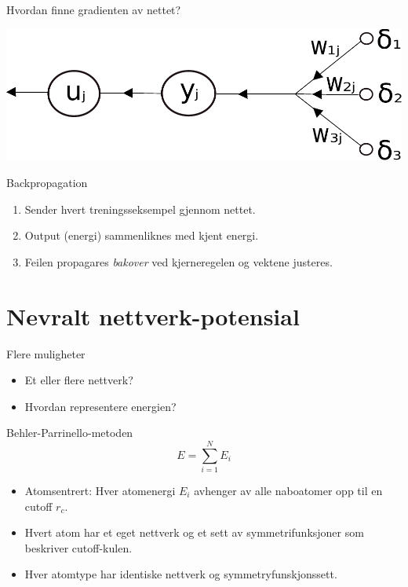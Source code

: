 \documentclass{beamer}
\begin{document}
\begin{frame}{Hvordan finne gradienten av nettet?}
 
\centering
\includegraphics[width = 0.8\linewidth]{../Figures/Theory/backprop.pdf}

\begin{block}{Backpropagation}
 \begin{enumerate}
  \item Sender hvert treningsseksempel gjennom nettet. 
  \item Output (energi) sammenliknes med kjent energi. 
  \item Feilen propagares \textit{bakover} ved kjerneregelen og vektene justeres. 
 \end{enumerate}
\end{block}
 
\end{frame}

\section{Nevralt nettverk-potensial}

\begin{frame}
 
\begin{block}{Flere muligheter}
 \begin{itemize}
  \item Et eller flere nettverk? 
  \item Hvordan representere energien?
 \end{itemize}
\end{block}

\begin{block}{Behler-Parrinello-metoden}
 \begin{equation*}
       E = \sum_{i=1}^N E_i
 \end{equation*}
 \begin{itemize}
  \item Atomsentrert: Hver atomenergi $E_i$ avhenger av alle naboatomer opp til en cutoff $r_c$.
  \item Hvert atom har et eget nettverk og et sett av symmetrifunksjoner som beskriver cutoff-kulen. 
  \item Hver atomtype har identiske nettverk og symmetryfunskjonssett.  
 \end{itemize}
\end{block}

\end{frame}
\end{document}
